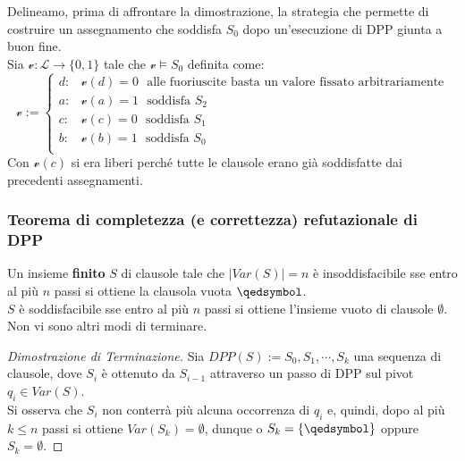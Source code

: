 Delineamo, prima di affrontare la dimostrazione, la strategia che permette di costruire un assegnamento che soddisfa $S_0$ dopo un'esecuzione di DPP giunta a buon fine. \\
Sia $\mathcal{v}: \mathscr{L} \rightarrow \{0,1\}$ tale che $\mathcal{v} \models S_0$ definita come:
$$
\mathcal{v} := 
\begin{cases}
        d :& \mathcal{v}(d) = 0 ~~~ \text{alle fuoriuscite basta un valore fissato arbitrariamente} \\ 
        a :& \mathcal{v}(a) = 1 ~~~ \text{soddisfa } S_2 \\
        c :& \mathcal{v}(c) = 0 ~~~ \text{soddisfa } S_1 \\
        b :& \mathcal{v}(b) = 1 ~~~ \text{soddisfa } S_0 \\
\end{cases}
$$
Con $\mathcal{v}(c)$ si era liberi perché tutte le clausole erano già soddisfatte dai precedenti assegnamenti.

\subsubsection{Teorema di completezza (e correttezza) refutazionale di DPP}
\begin{teon}
\label{thm:completezza-refutazionale-dpp}
Un insieme \textbf{finito} $S$ di clausole tale che $|Var(S)| = n$ è insoddisfacibile sse entro al più $n$ passi si ottiene la clausola vuota $\qedsymbol$. \\
$S$ è soddisfacibile sse entro al più $n$ passi si ottiene l'insieme vuoto di clausole $\emptyset$. \\
Non vi sono altri modi di terminare. 
\end{teon}

\begin{proof}[Dimostrazione di Terminazione]
Sia $DPP(S) := S_0, S_1, \cdots, S_k$ una sequenza di clausole, dove $S_i$ è ottenuto da $S_{i-1}$ attraverso un passo di DPP sul pivot $q_i \in Var(S)$. \\
Si osserva che $S_i$ non conterrà più alcuna occorrenza di $q_i$ e, quindi, dopo al più $k \leq n$ passi si ottiene $Var(S_k) = \emptyset$, dunque o $S_k = \{ \qedsymbol \}$ oppure $S_k = \emptyset$. 
\end{proof}

